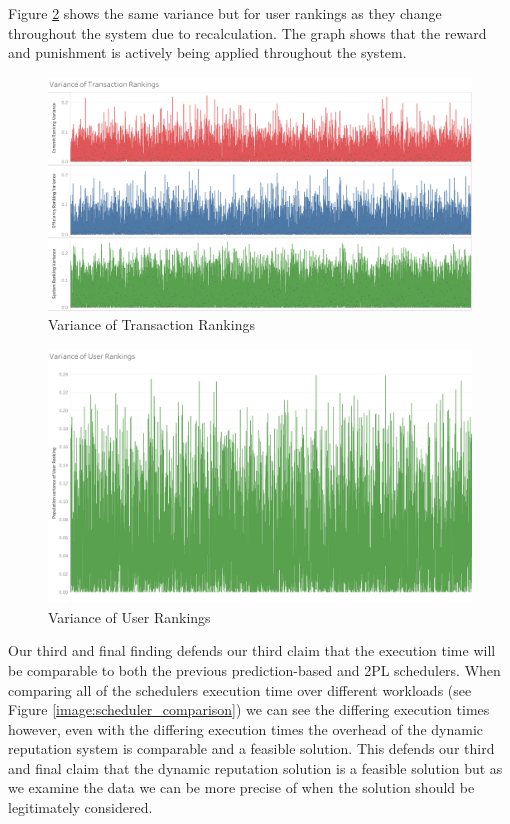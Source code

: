 Figure \ref{image:variance_of_user_rankings} shows the same variance but for user rankings as they change throughout the system due to recalculation. The graph shows that the reward and punishment is actively being applied throughout the system.

\begin{figure}
\centering
\includegraphics[scale=0.20]{images/VarianceofTransactionRankings.png}
\caption{Variance of Transaction Rankings}
\label{image:variance_of_transaction_rankings}
\end{figure}

\begin{figure}
\centering
\includegraphics[scale=0.20]{images/VarianceofUserRankings.png}
\caption{Variance of User Rankings}
\label{image:variance_of_user_rankings}
\end{figure}

Our third and final finding defends our third claim that the execution time will be comparable to both the previous prediction-based and \ac{2PL} schedulers. When comparing all of the schedulers execution time over different workloads (see Figure \ref{image:scheduler_comparison}) we can see the differing execution times however, even with the differing execution times the overhead of the dynamic reputation system is comparable and a feasible solution. This defends our third and final claim that the dynamic reputation solution is a feasible solution but as we examine the data we can be more precise of when the solution should be legitimately considered.

